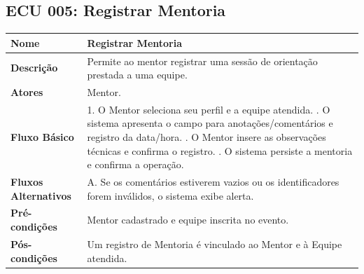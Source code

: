 \documentclass[12pt]{article}
\begin{document}
\subsection{ECU 005: Registrar Mentoria}
\begin{table}[H]
\centering
\small
\begin{tabular}{|p{3.2cm}|p{11.5cm}|}
\hline
\textbf{Nome} & Registrar Mentoria \\ \hline
\textbf{Descrição} & Permite ao mentor registrar uma sessão de orientação prestada a uma equipe. \\ \hline
\textbf{Atores} & Mentor. \\ \hline
\textbf{Fluxo Básico} & 
1. O Mentor seleciona seu perfil e a equipe atendida. \newline
2. O sistema apresenta o campo para anotações/comentários e registro da data/hora. \newline
3. O Mentor insere as observações técnicas e confirma o registro. \newline
4. O sistema persiste a mentoria e confirma a operação. \\ \hline
\textbf{Fluxos Alternativos} & 
A. Se os comentários estiverem vazios ou os identificadores forem inválidos, o sistema exibe alerta. \\ \hline
\textbf{Pré-condições} & Mentor cadastrado e equipe inscrita no evento. \\ \hline
\textbf{Pós-condições} & Um registro de Mentoria é vinculado ao Mentor e à Equipe atendida. \\ \hline
\end{tabular}
\end{table}
\end{document}
